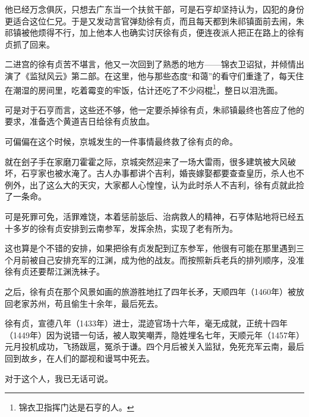 \begin{multicols}{\theparacolNo}
他已经万念俱灰，只想去广东当一个扶贫干部，可是石亨却坚持认为，囚犯的身份更适合这位仁兄。于是又发动言官弹劾徐有贞，而且每天都到朱祁镇面前去闹，朱祁镇被他烦得不行，加上他本人也确实讨厌徐有贞，便连夜派人把正在路上的徐有贞抓了回来。

二进宫的徐有贞苦不堪言，他又一次回到了熟悉的地方——锦衣卫诏狱，并倾情出演了《监狱风云》第二部。在这里，他与那些态度“和蔼”的看守们重逢了，每天住在潮湿的房间里，吃着霉变的牢饭，估计还吃了不少闷棍\footnote{锦衣卫指挥门达是石亨的人。}，整日以泪洗面。

可是对于石亨而言，这些还不够，他一定要杀掉徐有贞，朱祁镇最终也答应了他的要求，准备选个黄道吉日给徐有贞放血。

可偏偏在这个时候，京城发生的一件事情最终救了徐有贞的命。

就在刽子手在家磨刀霍霍之际，京城突然迎来了一场大雷雨，很多建筑被大风破坏，石亨家也被水淹了。古人办事都讲个吉利，婚丧嫁娶都要查查皇历，杀人也不例外，出了这么大的天灾，大家都人心惶惶，认为此时杀人不吉利，徐有贞就此捡了一条命。

可是死罪可免，活罪难饶，本着惩前毖后、治病救人的精神，石亨体贴地将已经五十多岁的徐有贞安排到云南参军，发挥余热，实现了老有所为。

这也算是个不错的安排，如果把徐有贞发配到辽东参军，他很有可能在那里遇到三个月前被自己安排充军的江渊，成为他的战友。而按照新兵老兵的排列顺序，没准徐有贞还要帮江渊洗袜子。

之后，徐有贞在那个风景如画的旅游胜地扛了四年长矛，天顺四年（1460年）被放回老家苏州，苟且偷生十余年，最后死去。

徐有贞，宣德八年（1433年）进士，混迹官场十六年，毫无成就，正统十四年（1449年）因为说错一句话，被人取笑嘲弄，隐姓埋名七年，天顺元年（1457年）元月投机成功，飞扬跋扈，冤杀于谦。四个月后被关入监狱，免死充军云南，最后回到故乡，在人们的鄙视和谩骂中死去。

对于这个人，我已无话可说。
\ifnum{}
	\end{multicols}
\fi
\newpage
